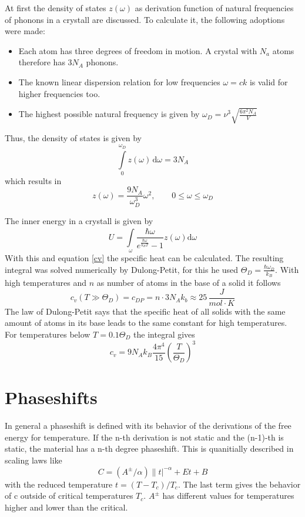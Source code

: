 \documentclass{include/thesisclass3}
\newcommand{\dd}{\text{d}}
\newcommand{\e}[1]{\,\si{#1}}
\begin{document}
At first the density of states $z(\omega)$ as derivation function of natural frequencies of phonons in a crystall are discussed.
To calculate it, the following adoptions were made:
\begin{itemize}
\item Each atom has three degrees of freedom in motion. A crystal with $N_a$ atoms therefore has $3N_A$ phonons.
\item The known linear dispersion relation for low frequencies $\omega=ck$ is valid for higher frequencies too.
\item The highest possible natural frequency is given by $\omega_D=\nu^3\sqrt{\frac{6 \pi ^2 N_A}{V}}$
\end{itemize}
Thus, the density of states is given by
\begin{equation}
\int \limits_{0}^{\omega_D} \! z(\omega) \, \dd\omega = 3N_A
\end{equation}
which results in
\begin{equation}
z(\omega)= \frac{9N_A}{\omega_D^3}\omega^2,\qquad 0\leq  \omega \leq \omega_D
\end{equation}

The inner energy in a crystall is given by
\begin{equation}
U= \int \limits_{\omega}^{}\! \frac{\hbar \omega}{e^{\frac{\hbar \omega}{k_B T}}-1} z(\omega)\dd \omega
\end{equation}
With this and equation \ref{cv} the specific heat can be calculated. The resulting integral was solved numerically by Dulong-Petit, for this he used $\Theta_D=\frac{\hbar \omega_D}{k_B}$. With high temperatures and $n$ as number of atoms in the base of a solid it follows
\begin{equation}
c_v(T\gg\Theta_D)=c_{DP}=n\cdot 3N_Ak_b\approx 25\e{\frac{J}{mol\cdot K}}
\end{equation}
The law of Dulong-Petit says that the specific heat of all solids with the same amount of atoms in its base leads to the same constant for high temperatures. For temperatures below  $T=0.1\Theta_D$ the integral gives
\begin{equation}
c_v=9N_Ak_B\frac{4\pi^4}{15}\left(\frac{T}{\Theta_D} \right)^3
\label{lowtemp}
\end{equation}

\section{Phaseshifts}
In general a phaseshift is defined with its behavior of the derivations of the free energy for temperature. 
If the n-th derivation is not static and the (n-1)-th is static, the material has a n-th degree phaseshift. 
This is quanitially described in scaling laws like
\begin{equation}
C=(A^{\pm}/\alpha)\|t|^{-\alpha}+Et+B
\label{phase}
\end{equation}
with the reduced temperature $t=(T-T_c)/T_c$. The last term gives the behavior of c outside of critical temperatures $T_c$. $A^{\pm}$ has different values for temperatures higher and lower than the critical. 
\end{document}

